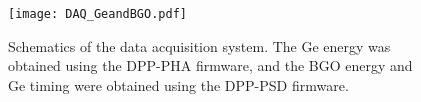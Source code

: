 \begin{figure}
  \centering
  \texttt{[image: DAQ\_GeandBGO.pdf]}
   \caption{Schematics of the data acquisition system.
   The Ge energy was obtained using the DPP-PHA firmware, and the BGO energy and Ge timing were obtained using the DPP-PSD firmware.}
   \label{fig:DAQ}
\end{figure}
